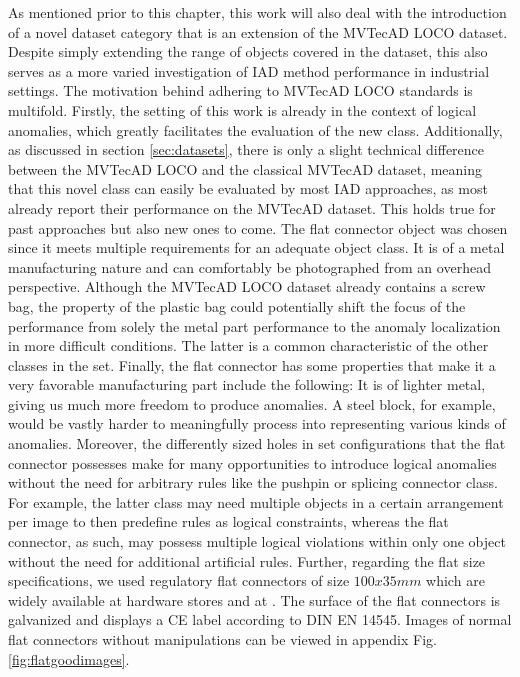 As mentioned prior to this chapter, this work will also deal with the introduction of a novel dataset category that is an extension of the MVTecAD LOCO \cite{LOCODentsAndScratchesBergmann2022} dataset. 
Despite simply extending the range of objects covered in the dataset, this also serves as a more varied investigation of IAD method performance in industrial settings. The motivation behind adhering 
to MVTecAD LOCO standards is multifold. Firstly, the setting of this work is already in the context of logical anomalies, which greatly facilitates the evaluation of the new class. Additionally, as 
discussed in section \ref{sec:datasets}, there is only a slight technical difference between the MVTecAD LOCO and the classical MVTecAD \cite{MVTEC_Bergmann_2021} dataset, meaning that this novel 
class can easily be evaluated by most IAD approaches, as most already report their performance on the MVTecAD dataset. This holds true for past approaches but also new ones 
to come.
\newline\newline
The flat connector object was chosen since it meets multiple requirements for an adequate object class. It is of a metal manufacturing nature and can comfortably be photographed from 
an overhead perspective. Although the MVTecAD LOCO dataset already contains a screw bag, the property of the plastic bag could potentially shift the focus of the performance from solely the metal 
part performance to the anomaly localization in more difficult conditions. The latter is a common characteristic of the other classes in the set. Finally, the flat connector has some 
properties that make it a very favorable manufacturing part include the following: It is of lighter metal, giving us much more freedom to produce anomalies. A steel block, for example, would be vastly 
harder to meaningfully process into representing various kinds of anomalies. Moreover, the differently sized holes in set configurations that the flat connector possesses make for many opportunities 
to introduce logical anomalies without the need for arbitrary rules like the pushpin or splicing connector class. For example, the latter class may need multiple objects in a certain arrangement per image to then predefine 
rules as logical constraints, whereas the flat connector, as such, may possess multiple logical violations within only one object without the need for additional artificial rules.
\newline
Further, regarding the flat size specifications, we used regulatory flat 
connectors of size $100x35 mm$ which are widely available at hardware stores and at \cite{flatconnectorlink}. The surface of the flat connectors is galvanized 
and displays a CE label according to DIN EN 14545. Images of normal flat connectors without manipulations can be viewed in appendix Fig. \ref{fig:flatgoodimages}.


